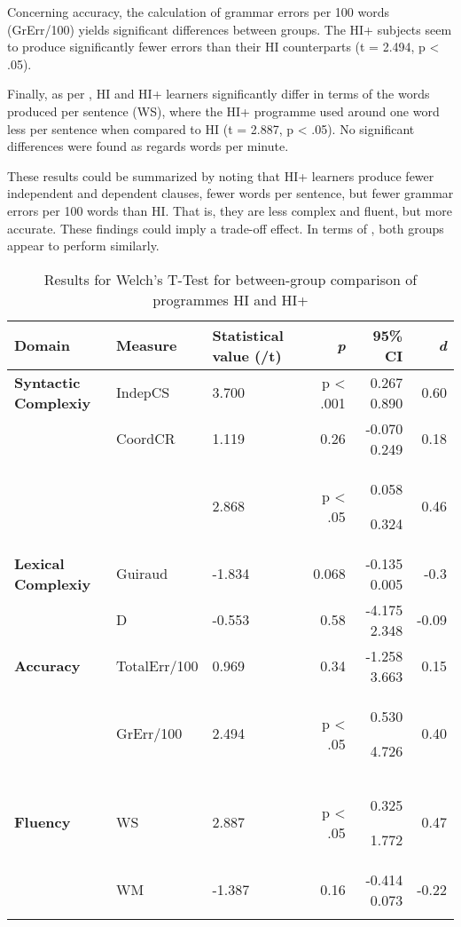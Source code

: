 \documentclass[output=paper]{langsci/langscibook}
\begin{document}
Concerning accuracy, the calculation of grammar errors per 100 words (GrErr/100) yields significant differences between groups. The HI+ subjects seem to produce significantly fewer errors than their HI counterparts (t = 2.494, p < .05). 

Finally, as per , HI and HI+ learners significantly differ in terms of the words produced per sentence (WS), where the HI+ programme used around one word less per sentence when compared to HI (t = 2.887,  p < .05).  No significant differences were found as regards words per minute.

These results could be summarized by noting that HI+ learners produce fewer independent and dependent clauses, fewer words per sentence, but fewer grammar errors per 100 words than HI. That is, they are less complex and fluent, but more accurate. These findings could imply a trade-off effect. In terms of , both groups appear to perform similarly.  

\begin{table}
\begin{tabularx}{\textwidth}{Ql Yrrr}
\lsptoprule
 \bfseries Domain & \bfseries Measure & \bfseries Statistical value (/t) & \bfseries \textit{p} & \bfseries 95\% CI & \bfseries \textit{d}\\
 \midrule 
\bfseries Syntactic Complexiy & IndepCS & 3.700 & p < .001 & {0.267} 0.890 & 0.60\\
& CoordCR & 1.119 & 0.26 & {-0.070  0.249} & 0.18\\
&  & 2.868 & p < .05 & {0.058}

{0.324} & 0.46\\
\bfseries Lexical Complexiy & Guiraud & -1.834 & 0.068 & {-0.135 0.005} & -0.3\\
& D & -0.553 & 0.58 & {-4.175 2.348} & -0.09\\
\bfseries Accuracy & TotalErr/100 & 0.969 & 0.34 & -1.258 3.663 & 0.15\\
& GrErr/100 & 2.494 & p < .05 & {0.530}

4.726 & 0.40\\
\bfseries Fluency & WS & 2.887 & p < .05 & {0.325}

1.772 & 0.47\\
& WM & -1.387 & 0.16 & -0.414  0.073 & -0.22\\
\lspbottomrule
\end{tabularx} 
\caption{ Results for Welch’s T-Test for between-group comparison of programmes HI and HI+}
\label{tab:tejada:7}
\end{table}
\end{document}
